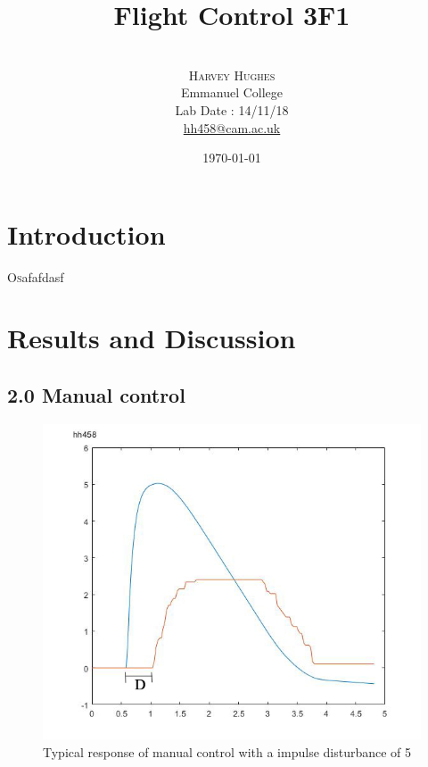 \documentclass[twoside,twocolumn]{article}
\title{Flight Control 3F1 } %
\author{%
\\
\textsc{Harvey Hughes} \\
\normalsize Emmanuel College \\ %
\normalsize Lab Date : 14/11/18 \\
\normalsize \href{mailto:hh458@cam.ac.uk}{hh458@cam.ac.uk} %
}
\date{\today} %
\begin{document}
\maketitle


\section{Introduction}

\lettrine[nindent=0em,lines=3]{O}   
safafdasf


\section{Results and Discussion}
\subsection{2.0 Manual control}
\begin{figure}[h]
  \centering
    \includegraphics[width=\linewidth]{2_impulse}
  \caption{Typical response of manual control with a impulse disturbance of 5 }
  \label{fig:2impulse}
\end{figure}
\end{document}
